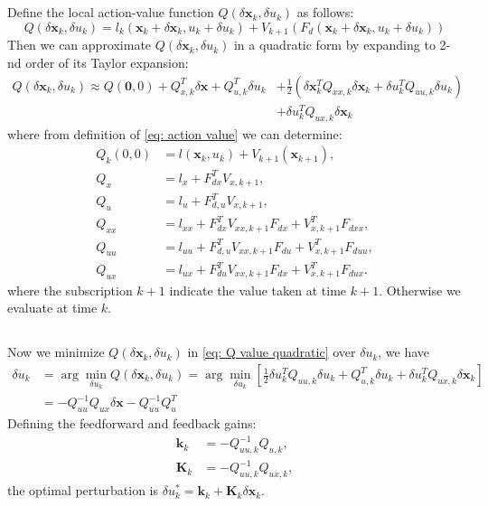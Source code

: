 \subsection{}
Define the local action-value function $Q(\delta\mathbf{x}_k, \delta u_k)$ as follows:
\begin{equation}
    Q(\delta\mathbf{x}_k, \delta u_k) = l_k(\mathbf{x}_k + \delta\mathbf{x}_k,u_k+\delta u_k) + V_{k+1}(F_d(\mathbf{x}_k + \delta\mathbf{x}_k,u_k+\delta u_k))
    \label{eq: action value}
\end{equation}
Then we can approximate $Q(\delta\mathbf{x}_k, \delta u_k)$ in a quadratic form by expanding to 2-nd order of its Taylor expansion:
\begin{align}
    \label{eq: Q value quadratic}
    Q(\delta\mathbf{x}_k, \delta u_k) \approx Q(\mathbf{0},0) + Q_{x,k}^T \delta \mathbf{x} + Q_{u,k}^T \delta u_k &+ \frac{1}{2}\left(\delta \mathbf{x}_k^T Q_{xx,k}\delta\mathbf{x}_k + \delta u_k^T Q_{uu,k}\delta u_k\right)\\ 
   &+ \delta u_k^T Q_{ux,k}\delta \mathbf{x}_k \nonumber   
\end{align}
where from definition of \ref{eq: action value} we can determine:
\begin{align*}
Q_k(0,0) &= l(\mathbf{x}_k, u_k) + V_{k+1}(\mathbf{x}_{k+1}), \\
Q_{x} &= l_{x} + F_{dx}^{T} V_{x,k+1}, \\
Q_{u} &= l_{u} + F_{d,u}^{T} V_{x,k+1}, \\
Q_{xx} &= l_{xx} + F_{dx}^{T} V_{xx,k+1} F_{dx} + V_{x,k+1}^{T} F_{dxx}, \\
Q_{uu} &= l_{uu} + F_{d,u}^{T} V_{xx,k+1} F_{du} + V_{x,k+1}^{T} F_{duu}, \\
Q_{ux} &= l_{ux} + F_{du}^{T} V_{xx,k+1} F_{dx} + V_{x,k+1}^{T} F_{dux}.
\end{align*}
where the subscription $k+1$ indicate the value taken at time $k+1$. Otherwise we evaluate at time $k$.
\subsection{}
Now we minimize $Q(\delta \mathbf{x}_k, \delta u_k)$ in \ref{eq: Q value quadratic} over $\delta u_k$, we have
\begin{align}
    \delta u_k &= \arg \min_{\delta u_k}{Q(\delta \mathbf{x}_k, \delta u_k)} = \arg \min_{\delta u_k} \left[\frac{1}{2}\delta u_k^T Q_{uu,k}\delta u_k  + Q_{u,k}^T \delta u_k + \delta u_k^T Q_{ux,k}\delta \mathbf{x}_k \right]\\
    &= -Q_{uu}^{-1}Q_{ux}\delta \mathbf{x} -Q_{uu}^{-1}Q_{u}^T
\end{align}
Defining the feedforward and feedback gains:
\begin{align}
    \mathbf{k}_k &= -Q_{uu,k}^{-1}Q_{u,k}, \\
    \mathbf{K}_k &= -Q_{uu,k}^{-1}Q_{ux,k},
\end{align}
the optimal perturbation is $\delta u_k^* = \mathbf{k}_k + \mathbf{K}_k\delta\mathbf{x}_k$.

